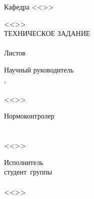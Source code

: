 {{  %
}%
{
\clearpage
\thispagestyle{empty}
\addtocounter{page}{-1}
\begin{center}
\VSTUTitleHeading
Кафедра <<\VSTUDepartment>>\\
\end{center}
\vspace{\fill}
\hfill\VSTUTitleHeadApproval
\vspace{8mm}
\begin{center}
<<\VSTUTitle>>\\
\vspace{\fill}
ТЕХНИЧЕСКОЕ ЗАДАНИЕ\\
\vspace{8mm}
\VSTUDocumentCode\\
\vspace{8mm}
Листов \totalpages\\
\vspace{8mm}
\end{center}
\begin{flushright}
\begin{minipage}[c]{15em}
Научный руководитель\\
\VSTUDirectorDegree,~\VSTUDirectorPost\\
\makebox[2cm]{\hrulefill}\VSTUDirectorName\\
<<\makebox[1.5cm]{\hrulefill}>>\makebox[3.5cm]{\hrulefill}\the\year
\end{minipage}
\end{flushright}
\vspace{8mm}
\begin{flushleft}
\begin{minipage}[c]{15em}
Нормоконтролер\\
\VSTUStandardsAdviserPost\\
\makebox[2cm]{\hrulefill}\VSTUStandardsAdviserName\\
<<\makebox[1.5cm]{\hrulefill}>>\makebox[3.5cm]{\hrulefill}\the\year
\end{minipage}
\hfill
\begin{minipage}[c]{15em}
Исполнитель\\
студент~группы~\VSTUStudentGroup\\
\makebox[2cm]{\hrulefill}\VSTUStudentName\\
<<\makebox[1.5cm]{\hrulefill}>>\makebox[3.5cm]{\hrulefill}\the\year
\end{minipage}
\end{flushleft}
\vspace{\fill}
}}
